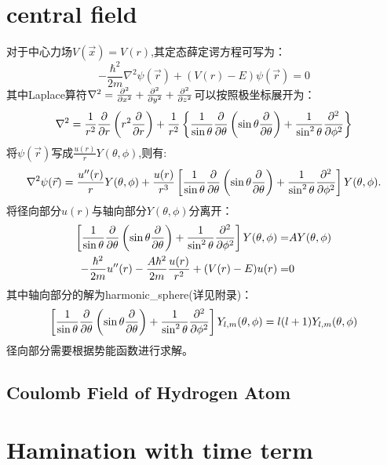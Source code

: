 \section{central field}
对于中心力场$V(\vec{x})=V(r)$,其定态薛定谔方程可写为：
\begin{equation}
    -\frac{\hbar^2}{2m}\nabla^2\psi(\vec{r})+(V(r)-E)\psi(\vec{r})=0
\end{equation}
其中Laplace算符$\nabla^2=\frac{\partial^2 }{\partial x^2}+\frac{\partial^2 }{\partial y^2}+\frac{\partial^2 }{\partial z^2}$可以按照极坐标展开为：
\begin{equation}
    \nabla^2=\frac{1}{r^2}\frac{\partial }{\partial r}\left(r^2\frac{\partial }{\partial r}\right)+\frac{1}{r^2}\left\lbrace \frac{1}{\sin\theta}\frac{\partial }{\partial \theta}\left(\sin\theta\frac{\partial }{\partial \theta}\right)+\frac{1}{\sin^2\theta}\frac{\partial^2 }{\partial \phi^2}\right\rbrace
\end{equation}
将$\psi(\vec{r})$写成$\frac{u(r)}{r}Y(\theta,\phi)$,则有:
\begin{equation}
    \nabla^2\psi(\vec{r})=\frac{u''(r)}{r}Y(\theta,\phi)+\frac{u(r)}{r^3}\left[ \frac{1}{\sin\theta}\frac{\partial }{\partial \theta}\left(\sin\theta\frac{\partial }{\partial \theta}\right)+\frac{1}{\sin^2\theta}\frac{\partial^2 }{\partial \phi^2}\right]Y(\theta,\phi).
\end{equation}
将径向部分$u(r)$与轴向部分$Y(\theta,\phi)$分离开：
\begin{align}
    \left[ \frac{1}{\sin\theta}\frac{\partial }{\partial \theta}\left(\sin\theta\frac{\partial }{\partial \theta}\right)+\frac{1}{\sin^2\theta}\frac{\partial^2 }{\partial \phi^2}\right]Y(\theta,\phi)=&AY(\theta,\phi)\\
    -\frac{\hbar^2}{2m}u''(r)-\frac{A\hbar^2}{2m}\frac{u(r)}{r^2}+(V(r)-E)u(r)=&0
\end{align}
其中轴向部分的解为\gls{harmonic_sphere}(详见附录)：
\begin{equation}
    \left[ \frac{1}{\sin\theta}\frac{\partial }{\partial \theta}\left(\sin\theta\frac{\partial }{\partial \theta}\right)+\frac{1}{\sin^2\theta}\frac{\partial^2 }{\partial \phi^2}\right]Y_{l,m}(\theta,\phi)=l(l+1)Y_{l,m}(\theta,\phi)
\end{equation}
径向部分需要根据势能函数进行求解。

\subsection{Coulomb Field of Hydrogen Atom}
\section{Hamination with time term}
\newpage 
